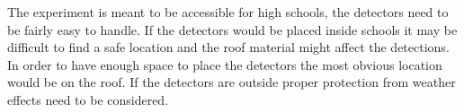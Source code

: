 The experiment is meant to be accessible for high schools, the detectors need to be fairly easy to handle. If the detectors would be placed inside schools it may be difficult to find a safe location and the roof material might affect the detections. In order to have enough space to place the detectors the most obvious location would be on the roof. If the detectors are outside proper protection from weather effects need to be considered.

